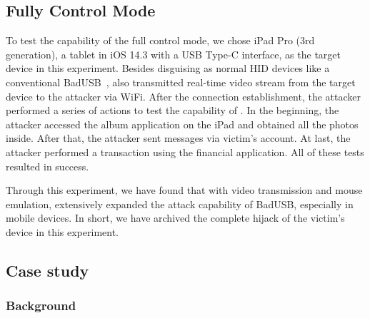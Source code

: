 \subsection{Fully Control Mode}

To test the capability of the full control mode, we chose iPad Pro (3rd
	generation), a tablet in iOS 14.3 with a USB Type-C interface, as the target
device in this experiment.  Besides disguising as normal HID devices like a
conventional BadUSB~\cite{badusb}, \tool also transmitted real-time video
stream from the target device to the attacker via WiFi.  After the connection
establishment, the attacker performed a series of actions to test the capability of
\tool. In the beginning, the attacker accessed the album application on the iPad and
obtained all the photos inside. After that, the attacker sent messages via victim's
account. At last, the attacker performed a transaction using the
financial application. All of these tests resulted in success.

Through this experiment, we have found that with video transmission and mouse
emulation, \tool extensively expanded the attack capability of BadUSB,
especially in mobile devices. In short, we have archived the complete hijack of the victim's
device in this experiment.

\subsection{Case study}
\label{subsec:case_study}

\subsubsection{Background}


